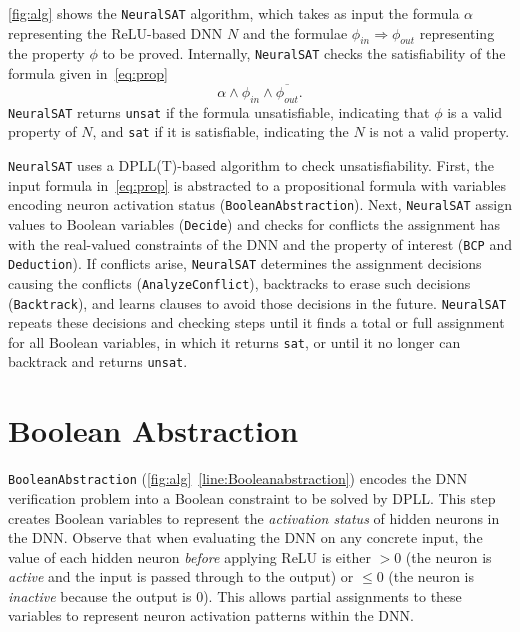 \documentclass[oneside,11pt,dvipsnames]{book}
\numberwithin{equation}{section}
\theoremstyle{definition}
\theoremstyle{remark}
\newcommand{\tool}{\texttt{NeuralSAT}}
\begin{document}
\autoref{fig:alg} shows the \tool{} algorithm, which takes as input the formula $\alpha$ representing the ReLU-based DNN $N$ and the formulae $\phi_{in}\Rightarrow \phi_{out}$ representing the property $\phi$ to be proved.
Internally, \tool{} checks the satisfiability of the formula given in~\autoref{eq:prop}
\begin{equation*}
  \alpha \land \phi_{in} \land \overline{\phi_{out}}.
\end{equation*}
\tool{} returns \texttt{unsat} if the formula unsatisfiable, indicating  that $\phi$ is a valid property of $N$, and \texttt{sat} if it is satisfiable, indicating the $N$ is not a valid property.

\tool{} uses a  DPLL(T)-based algorithm to check unsatisfiability.
First, the input formula in~\autoref{eq:prop} is abstracted to a propositional formula
with variables encoding neuron activation status (\texttt{BooleanAbstraction}).
Next, \tool{} assign values to Boolean variables (\texttt{Decide}) and checks for conflicts the assignment has with the real-valued constraints of the DNN and the property of interest (\texttt{BCP} and \texttt{Deduction}).
If conflicts arise, \tool{} determines the assignment decisions causing the conflicts (\texttt{AnalyzeConflict}), backtracks to erase such decisions (\texttt{Backtrack}), and learns clauses to avoid those decisions in the future.
\tool{} repeats these decisions and checking steps until it finds a total or full assignment for all Boolean variables, in which it returns \texttt{sat}, or until it no longer can backtrack and returns \texttt{unsat}.




\section{Boolean Abstraction}
\texttt{BooleanAbstraction} (\autoref{fig:alg}~\autoref{line:Booleanabstraction}) encodes the DNN verification problem into a Boolean constraint to be solved by DPLL.  This step creates Boolean variables to represent the \emph{activation status} of hidden neurons in the DNN. Observe that when evaluating the DNN on any concrete input, the value of each hidden neuron \emph{before} applying ReLU is either $>0$ (the neuron is \emph{active} and the input is passed through to the output) or $\le 0$ (the neuron is \emph{inactive} because the output is 0).
This allows partial assignments to these variables to represent neuron activation patterns within the DNN.
\end{document}
